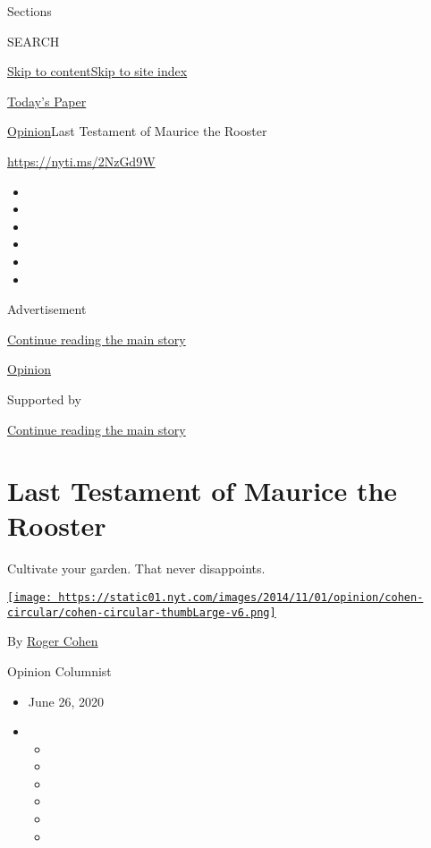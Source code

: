 Sections

SEARCH

\protect\hyperlink{site-content}{Skip to
content}\protect\hyperlink{site-index}{Skip to site index}

\href{https://myaccount.nytimes.com/auth/login?response_type=cookie\&client_id=vi}{}

\href{https://www.nytimes.com/section/todayspaper}{Today's Paper}

\href{/section/opinion}{Opinion}\textbar{}Last Testament of Maurice the
Rooster

\href{https://nyti.ms/2NzGd9W}{https://nyti.ms/2NzGd9W}

\begin{itemize}
\item
\item
\item
\item
\item
\item
\end{itemize}

Advertisement

\protect\hyperlink{after-top}{Continue reading the main story}

\href{/section/opinion}{Opinion}

Supported by

\protect\hyperlink{after-sponsor}{Continue reading the main story}

\hypertarget{last-testament-of-maurice-the-rooster}{%
\section{Last Testament of Maurice the
Rooster}\label{last-testament-of-maurice-the-rooster}}

Cultivate your garden. That never disappoints.

\href{https://www.nytimes.com/by/roger-cohen}{\texttt{[image: https://static01.nyt.com/images/2014/11/01/opinion/cohen-circular/cohen-circular-thumbLarge-v6.png]}}

By \href{https://www.nytimes.com/by/roger-cohen}{Roger Cohen}

Opinion Columnist

\begin{itemize}
\item
  June 26, 2020
\item
  \begin{itemize}
  \item
  \item
  \item
  \item
  \item
  \item
  \end{itemize}
\end{itemize}

